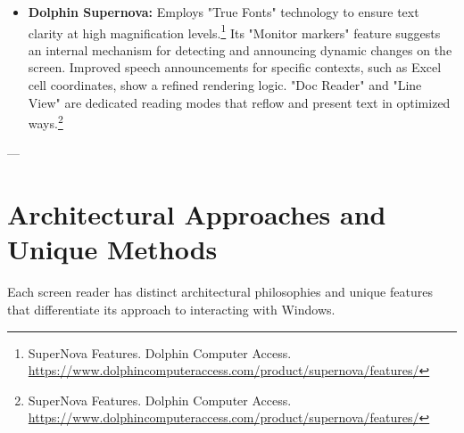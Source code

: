 \begin{itemize}[leftmargin=*,noitemsep,topsep=0pt]
    \item \textbf{Dolphin Supernova:} Employs "True Fonts" technology to ensure text clarity at high magnification levels.\footnote{SuperNova Features. Dolphin Computer Access. \url{https://www.dolphincomputeraccess.com/product/supernova/features/}} Its "Monitor markers" feature suggests an internal mechanism for detecting and announcing dynamic changes on the screen. Improved speech announcements for specific contexts, such as Excel cell coordinates, show a refined rendering logic. "Doc Reader" and "Line View" are dedicated reading modes that reflow and present text in optimized ways.\footnote{SuperNova Features. Dolphin Computer Access. \url{https://www.dolphincomputeraccess.com/product/supernova/features/}}
\end{itemize}

---

\section{Architectural Approaches and Unique Methods}
\label{sec:architectural-approaches}

Each screen reader has distinct architectural philosophies and unique features that differentiate its approach to interacting with Windows.

